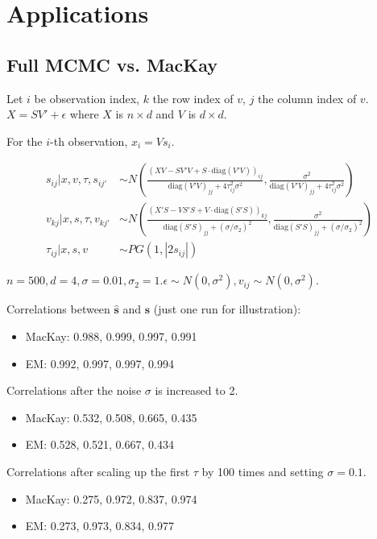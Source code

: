 \documentclass[11pt]{article}%
\begin{document}
\section{Applications}

\subsection{Full MCMC vs. MacKay}

Let $i$ be observation index, $k$ the row index of $v$, $j$ the column index of $v$. $X = SV' + \epsilon$ where $X$ is $n\times d$ and $V$ is $d\times d$. 


For the $i$-th observation, $x_i = V s_i$.

	\begin{align*}
		s_{ij} | x, v,\tau, s_{ij'} &\sim N\left(\frac{\left(XV-SV'V+S\cdot\text{diag}(V'V)\right)_{ij}}{\text{diag}(V'V)_{jj} + 4\tau_{ij}^2\sigma^2}, \frac{\sigma^2}{\text{diag}(V'V)_{jj} + 4\tau_{ij}^2 \sigma^2}\right) \\
		v_{kj} | x, s, \tau, v_{kj'} &\sim N\left(\frac{\left(X'S-VS'S+V\cdot\text{diag}(S'S)\right)_{kj}}{\text{diag}(S'S)_{jj} + (\sigma/\sigma_2)^2}, \frac{\sigma^2}{\text{diag}(S'S)_{jj} + (\sigma/\sigma_2)^2} \right)\\
		\tau_{ij} | x, s, v &\sim PG(1, |2s_{ij}|)
	\end{align*}

$n=500, d=4, \sigma = 0.01, \sigma_2 = 1. \epsilon \sim N(0, \sigma^2), v_{ij} \sim N(0, \sigma^2)$. 
\vspace{0.1in}

	Correlations between $ \bm{\hat s}$ and $\bm{s}$ (just one run for illustration):
	\begin{itemize}
		\item MacKay: 0.988, 0.999, 0.997, 0.991
		\item EM: 0.992, 0.997, 0.997, 0.994
	\end{itemize}
	
	\vspace{0.1in}
	Correlations after the noise $\sigma$ is increased to 2.
	\begin{itemize}
		\item MacKay: 0.532, 0.508, 0.665, 0.435
		\item EM: 0.528, 0.521, 0.667, 0.434
	\end{itemize}
	
	\vspace{0.1in}
	Correlations after scaling up the first $\tau$ by 100 times and setting $\sigma = 0.1$.
	\begin{itemize}
		\item MacKay: 0.275, 0.972, 0.837, 0.974
		\item EM: 0.273, 0.973, 0.834, 0.977
	\end{itemize}
\end{document}
